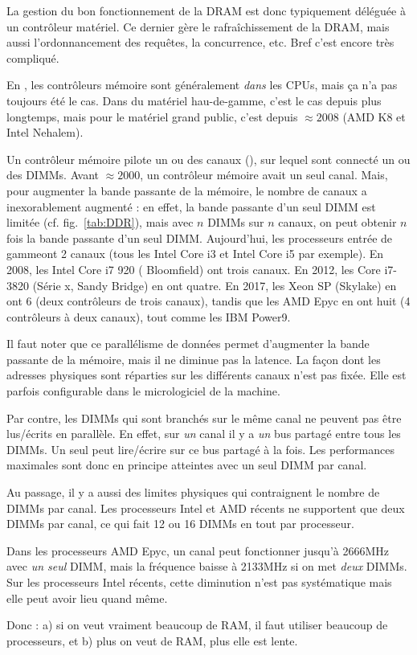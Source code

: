 La gestion du bon fonctionnement de la DRAM est donc typiquement déléguée à un
contrôleur matériel. Ce dernier gère le rafraîchissement de la DRAM, mais aussi
l'ordonnancement des requêtes, la concurrence, etc. Bref c'est encore très
compliqué.

En \the\year, les contrôleurs mémoire sont généralement \emph{dans} les CPUs,
mais ça n'a pas toujours été le cas. Dans du matériel hau-de-gamme, c'est le cas
depuis plus longtemps, mais pour le matériel \og grand public\fg, c'est depuis
$\approx 2008$ (AMD K8 et Intel \og Nehalem\fg).

Un contrôleur mémoire pilote un ou des canaux (\og {}\fg), sur
lequel sont connecté un ou des DIMMs. Avant $\approx 2000$, un contrôleur
mémoire avait un seul canal. Mais, pour augmenter la bande passante de la
mémoire, le nombre de canaux a inexorablement augmenté : en effet, la bande
passante d'un seul DIMM est limitée (cf. fig.~\ref{tab:DDR}), mais avec $n$
DIMMs sur $n$ canaux, on peut obtenir $n$ fois la bande passante d'un seul DIMM.
Aujourd'hui, les processeurs \og entrée de gamme\fg ont 2 canaux (tous les Intel
Core i3 et Intel Core i5 par exemple). En 2008, les Intel Core i7 920 (\og
Bloomfield\fg) ont trois canaux. En 2012, les Core i7-3820 (\og Série x, Sandy
Bridge\fg) en ont quatre. En 2017, les Xeon SP (\og Skylake\fg) en ont 6 (deux
contrôleurs de trois canaux), tandis que les AMD Epyc en ont huit (4 contrôleurs
à deux canaux), tout comme les IBM Power9.

Il faut noter que ce parallélisme de données permet d'augmenter la bande
passante de la mémoire, mais il ne diminue pas la latence. La façon dont les
adresses physiques sont réparties sur les différents canaux n'est pas
fixée. Elle est parfois configurable dans le micrologiciel de la machine.

Par contre, les DIMMs qui sont branchés sur le même canal ne peuvent pas être
lus/écrits en parallèle. En effet, sur \emph{un} canal il y a \emph{un} bus
partagé entre tous les DIMMs. Un seul peut lire/écrire sur ce bus partagé à la
fois. Les performances maximales sont donc en principe atteintes avec un seul
DIMM par canal.

\begin{danger}
  Au passage, il y a aussi des limites physiques qui contraignent le nombre de
  DIMMs par canal. Les processeurs Intel et AMD récents ne supportent que deux
  DIMMs par canal, ce qui fait 12 ou 16 DIMMs en tout par processeur.

  Dans les processeurs AMD Epyc, un canal peut fonctionner jusqu'à 2666MHz avec
  \emph{un seul} DIMM, mais la fréquence baisse à 2133MHz si on met \emph{deux}
  DIMMs. Sur les processeurs Intel récents, cette diminution n'est pas
  systématique mais elle peut avoir lieu quand même.

  Donc : a) si on veut vraiment beaucoup de RAM, il faut utiliser beaucoup de
  processeurs, et b) plus on veut de RAM, plus elle est lente.
\end{danger}

